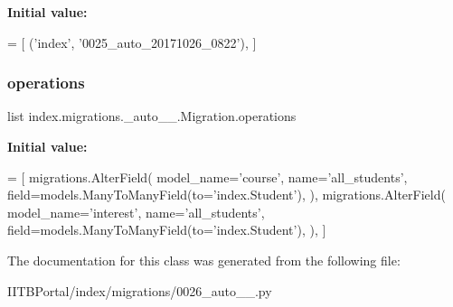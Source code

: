 {\bfseries Initial value\+:}
\begin{DoxyCode}
=  [
        (\textcolor{stringliteral}{'index'}, \textcolor{stringliteral}{'0025\_auto\_20171026\_0822'}),
    ]
\end{DoxyCode}
\mbox{\label{classindex_1_1migrations_1_10026__auto__20171028__1242_1_1Migration_a354f3935703c23fdf044c1d6073b7c29}} 
\subsubsection{\texorpdfstring{operations}{operations}}
{\footnotesize\ttfamily list index.\+migrations.\+\_\+auto\+\_\+\_.\+Migration.\+operations\hspace{0.3cm}{\ttfamily [static]}}

{\bfseries Initial value\+:}
\begin{DoxyCode}
=  [
        migrations.AlterField(
            model\_name=\textcolor{stringliteral}{'course'},
            name=\textcolor{stringliteral}{'all\_students'},
            field=models.ManyToManyField(to=\textcolor{stringliteral}{'index.Student'}),
        ),
        migrations.AlterField(
            model\_name=\textcolor{stringliteral}{'interest'},
            name=\textcolor{stringliteral}{'all\_students'},
            field=models.ManyToManyField(to=\textcolor{stringliteral}{'index.Student'}),
        ),
    ]
\end{DoxyCode}


The documentation for this class was generated from the following file\+:\begin{DoxyCompactItemize}
\item 
I\+I\+T\+B\+Portal/index/migrations/0026\+\_\+auto\+\_\+\_.\+py\end{DoxyCompactItemize}

